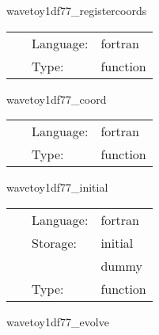 \hspace{5mm} wavetoy1df77\_registercoords 

\hspace{5mm}{\it register wavetoy1df77 coordinates } 


\hspace{5mm}

 \begin{tabular*}{160mm}{cll} 
~ & Language:  & fortran \\ 
~ & Type:  & function \\ 
\end{tabular*} 


\vspace{5mm}


\hspace{5mm} wavetoy1df77\_coord 

\hspace{5mm}{\it set up 1d coordinates } 


\hspace{5mm}

 \begin{tabular*}{160mm}{cll} 
~ & Language:  & fortran \\ 
~ & Type:  & function \\ 
\end{tabular*} 


\vspace{5mm}


\hspace{5mm} wavetoy1df77\_initial 

\hspace{5mm}{\it initial data for 1d wave equation } 


\hspace{5mm}

 \begin{tabular*}{160mm}{cll} 
~ & Language:  & fortran \\ 
~ & Storage:  & initial \\ 
~& ~ &dummy\\ 
~ & Type:  & function \\ 
\end{tabular*} 


\vspace{5mm}


\hspace{5mm} wavetoy1df77\_evolve 

